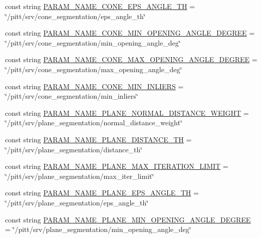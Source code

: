 \begin{DoxyCompactItemize}
const string \hyperlink{namespacesrvm_a6023448f3a02902eec73727de0699571}{P\-A\-R\-A\-M\-\_\-\-N\-A\-M\-E\-\_\-\-C\-O\-N\-E\-\_\-\-E\-P\-S\-\_\-\-A\-N\-G\-L\-E\-\_\-\-T\-H} = \char`\"{}/pitt/srv/cone\-\_\-segmentation/eps\-\_\-angle\-\_\-th\char`\"{}
\item 
const string \hyperlink{namespacesrvm_aeee569608876be7a3b9c7deb18037aeb}{P\-A\-R\-A\-M\-\_\-\-N\-A\-M\-E\-\_\-\-C\-O\-N\-E\-\_\-\-M\-I\-N\-\_\-\-O\-P\-E\-N\-I\-N\-G\-\_\-\-A\-N\-G\-L\-E\-\_\-\-D\-E\-G\-R\-E\-E} = \char`\"{}/pitt/srv/cone\-\_\-segmentation/min\-\_\-opening\-\_\-angle\-\_\-deg\char`\"{}
\item 
const string \hyperlink{namespacesrvm_acfa6baa980590edd027af05d215e92f4}{P\-A\-R\-A\-M\-\_\-\-N\-A\-M\-E\-\_\-\-C\-O\-N\-E\-\_\-\-M\-A\-X\-\_\-\-O\-P\-E\-N\-I\-N\-G\-\_\-\-A\-N\-G\-L\-E\-\_\-\-D\-E\-G\-R\-E\-E} = \char`\"{}/pitt/srv/cone\-\_\-segmentation/max\-\_\-opening\-\_\-angle\-\_\-deg\char`\"{}
\item 
const string \hyperlink{namespacesrvm_a228bc70cd1578c12026757a28b369ea1}{P\-A\-R\-A\-M\-\_\-\-N\-A\-M\-E\-\_\-\-C\-O\-N\-E\-\_\-\-M\-I\-N\-\_\-\-I\-N\-L\-I\-E\-R\-S} = \char`\"{}/pitt/srv/cone\-\_\-segmentation/min\-\_\-inliers\char`\"{}
\item 
const string \hyperlink{namespacesrvm_aa92c5d3af4d21e544d422eb317a4558d}{P\-A\-R\-A\-M\-\_\-\-N\-A\-M\-E\-\_\-\-P\-L\-A\-N\-E\-\_\-\-N\-O\-R\-M\-A\-L\-\_\-\-D\-I\-S\-T\-A\-N\-C\-E\-\_\-\-W\-E\-I\-G\-H\-T} = \char`\"{}/pitt/srv/plane\-\_\-segmentation/normal\-\_\-distance\-\_\-weight\char`\"{}
\item 
const string \hyperlink{namespacesrvm_afdcd3222bf4aee9b48f2eb9f56b496e5}{P\-A\-R\-A\-M\-\_\-\-N\-A\-M\-E\-\_\-\-P\-L\-A\-N\-E\-\_\-\-D\-I\-S\-T\-A\-N\-C\-E\-\_\-\-T\-H} = \char`\"{}/pitt/srv/plane\-\_\-segmentation/distance\-\_\-th\char`\"{}
\item 
const string \hyperlink{namespacesrvm_a64f33d61b5b06a55234199642e8db783}{P\-A\-R\-A\-M\-\_\-\-N\-A\-M\-E\-\_\-\-P\-L\-A\-N\-E\-\_\-\-M\-A\-X\-\_\-\-I\-T\-E\-R\-A\-T\-I\-O\-N\-\_\-\-L\-I\-M\-I\-T} = \char`\"{}/pitt/srv/plane\-\_\-segmentation/max\-\_\-iter\-\_\-limit\char`\"{}
\item 
const string \hyperlink{namespacesrvm_a2a1ca687f68863e4c300c2cd269c53ac}{P\-A\-R\-A\-M\-\_\-\-N\-A\-M\-E\-\_\-\-P\-L\-A\-N\-E\-\_\-\-E\-P\-S\-\_\-\-A\-N\-G\-L\-E\-\_\-\-T\-H} = \char`\"{}/pitt/srv/plane\-\_\-segmentation/eps\-\_\-angle\-\_\-th\char`\"{}
\item 
const string \hyperlink{namespacesrvm_a31fdf967c804692f260cf6ec8e219232}{P\-A\-R\-A\-M\-\_\-\-N\-A\-M\-E\-\_\-\-P\-L\-A\-N\-E\-\_\-\-M\-I\-N\-\_\-\-O\-P\-E\-N\-I\-N\-G\-\_\-\-A\-N\-G\-L\-E\-\_\-\-D\-E\-G\-R\-E\-E} = \char`\"{}/pitt/srv/plane\-\_\-segmentation/min\-\_\-opening\-\_\-angle\-\_\-deg\char`\"{}

\end{DoxyCompactItemize}
